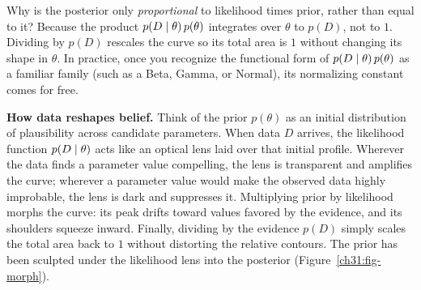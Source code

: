 \begin{whybox}
Why is the posterior only \emph{proportional} to likelihood times prior, rather than equal to it?
Because the product $p(D\mid\theta)\,p(\theta)$ integrates over $\theta$ to $p(D)$, not to $1$.
Dividing by $p(D)$ rescales the curve so its total area is $1$ without changing its shape in
$\theta$. In practice, once you recognize the functional form of $p(D\mid\theta)\,p(\theta)$
as a familiar family (such as a Beta, Gamma, or Normal), its normalizing constant comes for free.
\end{whybox}

\begin{intuitionbox}
\textbf{How data reshapes belief.}
Think of the prior $p(\theta)$ as an initial distribution of plausibility across candidate
parameters. When data $D$ arrives, the likelihood function $p(D\mid\theta)$ acts like an
optical lens laid over that initial profile. Wherever the data finds a parameter value
compelling, the lens is transparent and amplifies the curve; wherever a parameter value
would make the observed data highly improbable, the lens is dark and suppresses it.
Multiplying prior by likelihood morphs the curve: its peak drifts toward values favored by
the evidence, and its shoulders squeeze inward. Finally, dividing by the evidence
$p(D)$ simply scales the total area back to $1$ without distorting the relative contours.
The prior has been sculpted under the likelihood lens into the posterior
(Figure~\ref{ch31:fig-morph}).
\end{intuitionbox}

